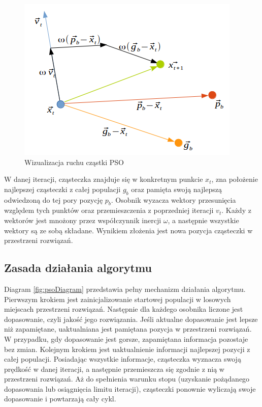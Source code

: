 \begin{figure}[H]
\begin{center} 
\includegraphics[scale=0.8]{tresc/pics/psoRuch.png}
\caption{Wizualizacja ruchu cząstki PSO}
\label{fig:psoWizualizacja}
\end{center}
\end{figure}

W danej iteracji, cząsteczka znajduje się w konkretnym punkcie $x_t$, zna położenie najlepszej cząsteczki z całej populacji $g_b$ oraz pamięta swoją najlepszą odwiedzoną do tej pory pozycję $p_b$. Osobnik wyzacza wektory przesunięcia względem tych punktów oraz przemieszczenia z poprzedniej iteracji $v_t$. Każdy z wektorów jest mnożony przez współczynnik inercji $\omega$, a następnie wszystkie wektory są ze sobą składane. Wynikiem złożenia jest nowa pozycja cząsteczki w przestrzeni rozwiązań.

\subsection{Zasada działania algorytmu}
\label{sec:psoDzialanie}
Diagram \ref{fig:psoDiagram} przedstawia pełny mechanizm działania algorytmu. Pierwszym krokiem jest zainicjalizowanie startowej populacji w losowych miejscach przestrzeni rozwiązań. Następnie dla każdego osobnika liczone jest dopasowanie, czyli jakość jego rozwiązania. Jeśli aktualne dopasowanie jest lepsze niż zapamiętane, uaktualniana jest pamiętana pozycja w przestrzeni rozwiązań. W przypadku, gdy dopasowanie jest gorsze, zapamiętana informacja pozostaje bez zmian. Kolejnym krokiem jest uaktualnienie informacji najlepszej pozycji z całej populacji. Posiadając wszystkie informacje, cząsteczka wyznacza swoją prędkość w danej iteracji, a następnie przemieszcza się zgodnie z nią w przestrzeni rozwiązań. Aż do spełnienia warunku stopu (uzyskanie pożądanego dopasowania lub osiągnięcia limitu iteracji), cząsteczki ponownie wyliczają swoje dopasowanie i powtarzają cały cykl.

